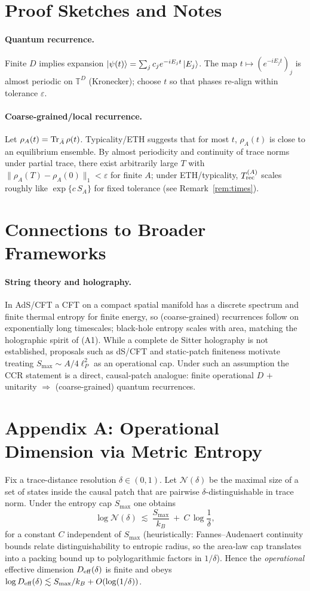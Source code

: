 \documentclass[12pt]{article}
\newcommand{\Smax}{S_{\max}}
\theoremstyle{remark}
\begin{document}
\section{Proof Sketches and Notes}
\paragraph{Quantum recurrence.} Finite $D$ implies expansion $|\psi(t)\rangle=\sum_j c_j e^{-iE_j t}\ket{E_j}$. The map $t\mapsto (e^{-iE_j t})_j$ is almost periodic on $\mathbb{T}^D$ (Kronecker); choose $t$ so that phases re-align within tolerance $\varepsilon$.
\paragraph{Coarse-grained/local recurrence.} Let $\rho_A(t)=\Tr_{\bar A}\rho(t)$. Typicality/ETH suggests that for most $t$, $\rho_A(t)$ is close to an equilibrium ensemble. By almost periodicity and continuity of trace norms under partial trace, there exist arbitrarily large $T$ with $\|\rho_A(T)-\rho_A(0)\|_1<\varepsilon$ for finite $A$; under ETH/typicality, $T^{(A)}_{\rm rec}$ scales roughly like $\exp\{c\,S_A\}$ for fixed tolerance (see Remark~\ref{rem:times}).

\section{Connections to Broader Frameworks}

\paragraph{String theory and holography.}
In AdS/CFT a CFT on a compact spatial manifold has a discrete spectrum and finite thermal entropy for finite energy, so (coarse-grained) recurrences follow on exponentially long timescales; black-hole entropy scales with area, matching the holographic spirit of (A1). While a complete de Sitter holography is not established, proposals such as dS/CFT and static-patch finiteness motivate treating $\Smax\!\sim\! A/4\ell_P^2$ as an operational cap. Under such an assumption the CCR statement is a direct, causal-patch analogue: finite operational $D$ $+$ unitarity $\Rightarrow$ (coarse-grained) quantum recurrences.

\appendix
\section*{Appendix A: Operational Dimension via Metric Entropy}
Fix a trace-distance resolution $\delta\in(0,1)$. Let $\mathcal{N}(\delta)$ be the maximal size of a set of states inside the causal patch that are pairwise $\delta$-distinguishable in trace norm. Under the entropy cap $\Smax$ one obtains
\[
\log \mathcal{N}(\delta)\ \lesssim\ \frac{\Smax}{k_B}\ +\ C\,\log\!\frac{1}{\delta},
\]
for a constant $C$ independent of $\Smax$ (heuristically: Fannes--Audenaert continuity bounds relate distinguishability to entropic radius, so the area-law cap translates into a packing bound up to polylogarithmic factors in $1/\delta$). Hence the \emph{operational} effective dimension $D_{\rm eff}(\delta)$ is finite and obeys $\log D_{\rm eff}(\delta)\lesssim \Smax/k_B+O(\log(1/\delta))$.
\end{document}
